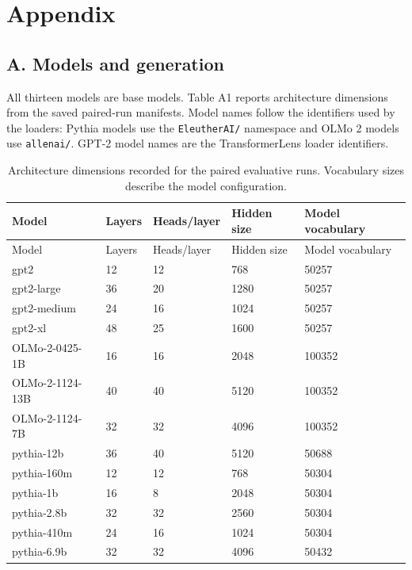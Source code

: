 \documentclass[
  english,
]{article}
\begin{document}


\clearpage
\setcounter{table}{0}
\renewcommand{\thetable}{A\arabic{table}}
\renewcommand{\theHtable}{appendix.\arabic{table}}

\section{Appendix}\label{appendix}

\subsection{A. Models and generation}\label{a.-models-and-generation}

All thirteen models are base models. Table A1 reports architecture dimensions from the saved paired-run manifests. Model names follow the identifiers used by the loaders: Pythia models use the \texttt{EleutherAI/} namespace and OLMo 2 models use \texttt{allenai/}. GPT-2 model names are the TransformerLens loader identifiers.

\begingroup\small
\begin{longtable}[]{@{}lllll@{}}
\caption{Architecture dimensions recorded for the paired evaluative runs. Vocabulary sizes describe the model configuration. \label{tab:models}}\tabularnewline
\toprule\noalign{}
Model & Layers & Heads/layer & Hidden size & Model vocabulary \\
\midrule\noalign{}
\endfirsthead
\toprule\noalign{}
Model & Layers & Heads/layer & Hidden size & Model vocabulary \\
\midrule\noalign{}
\endhead
\bottomrule\noalign{}
\endlastfoot
gpt2 & 12 & 12 & 768 & 50257 \\
gpt2-large & 36 & 20 & 1280 & 50257 \\
gpt2-medium & 24 & 16 & 1024 & 50257 \\
gpt2-xl & 48 & 25 & 1600 & 50257 \\
OLMo-2-0425-1B & 16 & 16 & 2048 & 100352 \\
OLMo-2-1124-13B & 40 & 40 & 5120 & 100352 \\
OLMo-2-1124-7B & 32 & 32 & 4096 & 100352 \\
pythia-12b & 36 & 40 & 5120 & 50688 \\
pythia-160m & 12 & 12 & 768 & 50304 \\
pythia-1b & 16 & 8 & 2048 & 50304 \\
pythia-2.8b & 32 & 32 & 2560 & 50304 \\
pythia-410m & 24 & 16 & 1024 & 50304 \\
pythia-6.9b & 32 & 32 & 4096 & 50432 \\
\end{longtable}
\endgroup
\end{document}
